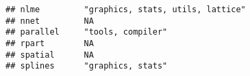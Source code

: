 \documentclass[]{book}
\begin{document}
\begin{verbatim}
## nlme         "graphics, stats, utils, lattice"                                                                                                                                                                                                                                                                                                                                                                                                                                                                           
## nnet         NA                                                                                                                                                                                                                                                                                                                                                                                                                                                                                                          
## parallel     "tools, compiler"                                                                                                                                                                                                                                                                                                                                                                                                                                                                                           
## rpart        NA                                                                                                                                                                                                                                                                                                                                                                                                                                                                                                          
## spatial      NA                                                                                                                                                                                                                                                                                                                                                                                                                                                                                                          
## splines      "graphics, stats"                                                                                                                                                                                                                                                                                                                                                                                                                                                                                           

\end{verbatim}
\end{document}
